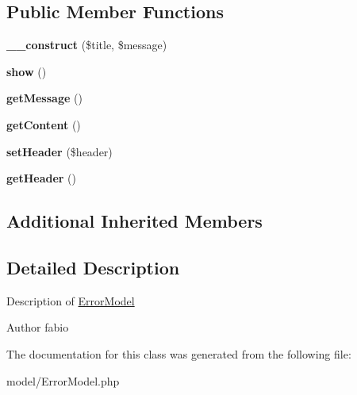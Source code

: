 \subsection*{Public Member Functions}
\begin{DoxyCompactItemize}
\item 
\hypertarget{classErrorModel_abceb91bb8d66809f1016c685fff3b281}{{\bfseries \+\_\+\+\_\+construct} (\$title, \$message)}\label{classErrorModel_abceb91bb8d66809f1016c685fff3b281}

\item 
\hypertarget{classErrorModel_af4f6e8ad91bdff9b86769ad4ea01f7f5}{{\bfseries show} ()}\label{classErrorModel_af4f6e8ad91bdff9b86769ad4ea01f7f5}

\item 
\hypertarget{classErrorModel_a01701980e78f4d77cdf11e88e4506507}{{\bfseries get\+Message} ()}\label{classErrorModel_a01701980e78f4d77cdf11e88e4506507}

\item 
\hypertarget{classErrorModel_a1bb43423f160f44504fbbc9750f47087}{{\bfseries get\+Content} ()}\label{classErrorModel_a1bb43423f160f44504fbbc9750f47087}

\item 
\hypertarget{classErrorModel_a8d3bc764cfde8e9f70d13f91796e1621}{{\bfseries set\+Header} (\$header)}\label{classErrorModel_a8d3bc764cfde8e9f70d13f91796e1621}

\item 
\hypertarget{classErrorModel_a1fd5e86a80a654f464811fde25b5928f}{{\bfseries get\+Header} ()}\label{classErrorModel_a1fd5e86a80a654f464811fde25b5928f}

\end{DoxyCompactItemize}
\subsection*{Additional Inherited Members}


\subsection{Detailed Description}
Description of \hyperlink{classErrorModel}{Error\+Model}

\begin{DoxyAuthor}{Author}
fabio 
\end{DoxyAuthor}


The documentation for this class was generated from the following file\+:\begin{DoxyCompactItemize}
\item 
model/Error\+Model.\+php\end{DoxyCompactItemize}

